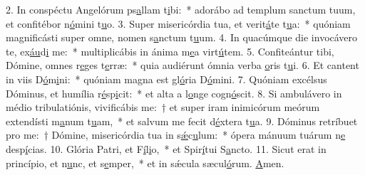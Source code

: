 2. In conspéctu Angelórum ps\uline{a}llam t\uline{i}bi:~* adorábo ad templum sanctum tuum, et confitébor n\uline{ó}mini t\uline{u}o.
3. Super misericórdia tua, et verit\uline{á}te t\uline{u}a:~* quóniam magnificásti super omne, nomen s\uline{a}nctum t\uline{u}um.
4. In quacúmque die invocávero te, ex\uline{áu}d\uline{i} me:~* multiplicábis in ánima m\uline{e}a virt\uline{ú}tem.
5. Confiteántur tibi, Dómine, omnes r\uline{e}ges t\uline{e}rræ:~* quia audiérunt ómnia verba \uline{o}ris t\uline{u}i.
6. Et cantent in viis D\uline{ó}m\uline{i}ni:~* quóniam magna est gl\uline{ó}ria D\uline{ó}mini.
7. Quóniam excélsus Dóminus, et humília r\uline{é}sp\uline{i}cit:~* et alta a l\uline{o}nge cogn\uline{ó}scit.
8. Si ambulávero in médio tribulatiónis, vivificábis me:~† et super iram inimicórum meórum extendísti m\uline{a}num t\uline{u}am,~* et salvum me fecit d\uline{é}xtera t\uline{u}a.
9. Dóminus retríbuet pro me:~† Dómine, misericórdia tua in s\uline{ǽ}c\uline{u}lum:~* ópera mánuum tuárum n\uline{e} desp\uline{í}cias.
10. Glória Patri, et F\uline{í}l\uline{i}o,~* et Spir\uline{í}tui S\uline{a}ncto.
11. Sicut erat in princípio, et n\uline{u}nc, et s\uline{e}mper,~* et in sǽcula sæcul\uline{ó}rum. \uline{A}men.
